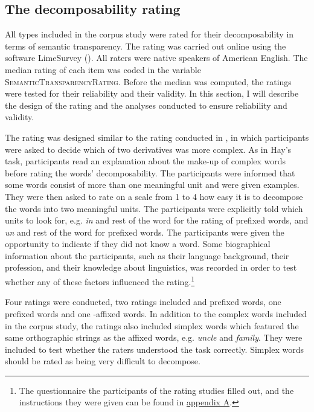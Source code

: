 \subsection{The decomposability rating} \label{decomposability rating corpus}

All types included in the corpus study were rated for their decomposability in terms of semantic transparency. The rating was carried out online using the software LimeSurvey (\citealt{LimeSurveyProjectTeam.2015}). All raters were native speakers of American English. The median rating of each item was coded in the variable  \textsc{SemanticTransparencyRating}. Before the median was computed, the ratings were tested for their reliability and their validity. In this section, I will describe the design of the rating and the analyses conducted to ensure reliability and validity. 

The rating was designed similar to the rating conducted in \cite{Hay.2001}, in which participants were asked to decide which of two derivatives was more complex. As in Hay's task,  participants read an explanation about the make-up of complex words before rating the words' decomposability.  The participants were informed that some words consist of more than one meaningful unit and were given examples. 
They were then asked to rate on a scale from 1 to 4 how easy it is to decompose the words into two meaningful units. The participants were explicitly told which units to look for, e.g.\textit{ in} and rest of the word for the rating of prefixed words, and \textit{un} and rest of the word for prefixed words. The participants were given the opportunity to  indicate if they did not know a word. 
Some biographical information about the participants, such as their language background, their profession, and their knowledge about linguistics, was recorded in order to test whether any of these factors influenced the rating.\footnote{The questionnaire the participants of the rating studies filled out, and the instructions they were given can be found in \hyperref[Appendix A: Decomposability Rating]{appendix A}. } 

Four ratings were conducted, two ratings included  and prefixed words, one  prefixed words and one -affixed words. In addition to the complex words included in the corpus study, the ratings also included simplex words which featured the same orthographic strings as the affixed words, e.g. \textit{{un}cle} and \textit{fami{ly}}. They were included to test whether the raters understood the task correctly. Simplex words should be rated as being very difficult to decompose. 

